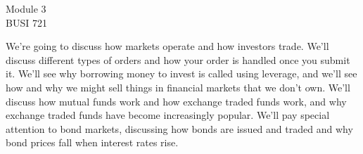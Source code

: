 \documentclass[english,12pt]{amsart}
\begin{document}
\begin{center}
    Module 3\\
    BUSI 721
\end{center}

\baselineskip

We're going to discuss how markets operate and how investors trade.  We'll discuss different types of orders and how your order is handled once you submit it.  We'll see why borrowing money to invest is called using leverage, and we'll see how and why we might sell things in financial markets that we don't own.  We'll discuss how mutual funds work and how exchange traded funds work, and why exchange traded funds have become increasingly popular.  We'll pay special attention to bond markets, discussing how bonds are issued and traded and why bond prices fall when interest rates rise.
\end{document}
